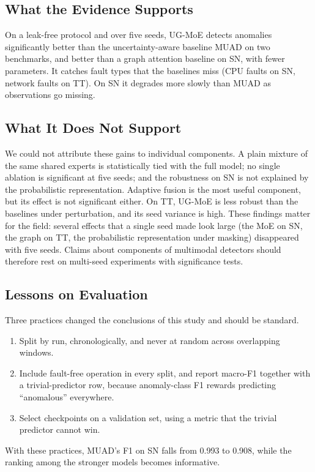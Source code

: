 \documentclass[journal]{IEEEtran}
\newcommand{\ugmoe}{UG-MoE}
\begin{document}
\subsection{What the Evidence Supports}
On a leak-free protocol and over five seeds, \ugmoe{} detects anomalies significantly better than the
uncertainty-aware baseline MUAD on two benchmarks, and better than a graph attention baseline on SN, with
fewer parameters. It catches fault types that the baselines miss (CPU faults on SN, network faults on TT).
On SN it degrades more slowly than MUAD as observations go missing.

\subsection{What It Does Not Support}
We could not attribute these gains to individual components. A plain mixture of the same shared experts
is statistically tied with the full model; no single ablation is significant at five seeds; and the
robustness on SN is not explained by the probabilistic representation. Adaptive fusion is the most useful
component, but its effect is not significant either. On TT, \ugmoe{} is less robust than the baselines under
perturbation, and its seed variance is high. These findings matter for the field: several effects that a
single seed made look large (the MoE on SN, the graph on TT, the probabilistic representation under masking)
disappeared with five seeds. Claims about components of multimodal detectors should therefore rest on
multi-seed experiments with significance tests.

\subsection{Lessons on Evaluation}
Three practices changed the conclusions of this study and should be standard.
\begin{enumerate}
  \item Split by run, chronologically, and never at random across overlapping windows.
  \item Include fault-free operation in every split, and report macro-F1 together with a trivial-predictor
  row, because anomaly-class F1 rewards predicting ``anomalous'' everywhere.
  \item Select checkpoints on a validation set, using a metric that the trivial predictor cannot win.
\end{enumerate}
With these practices, MUAD's F1 on SN falls from 0.993 to 0.908, while the ranking among the stronger models
becomes informative.
\end{document}
